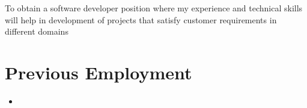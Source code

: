 \documentclass[11pt,a4paper,sans]{moderncv}        %
\begin{document}
\makecvtitle
\small{To obtain a software developer position where my experience and technical skills will help in development of projects that satisfy customer requirements in different domains}
\section{\textcolor{myblue}{Previous Employment}}

\vspace{6pt}

\begin{itemize}

\item{

}
\end{itemize}
\end{document}

